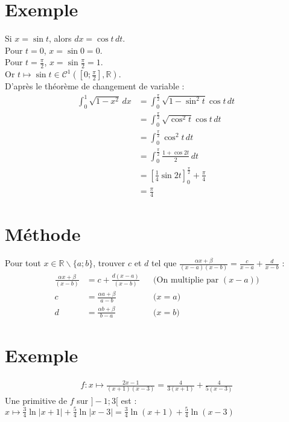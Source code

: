 \documentclass[../main.tex]{subfiles}
\begin{document}
\setcounter{section}{71}
\section{Exemple}
Si $x = \sin t$, alors $dx = \cos t \,dt$. \\
Pour $t = 0$, $x = \sin 0 = 0$. \\
Pour $t = \frac{\pi}{2}$, $x = \sin \frac{\pi}{2} = 1$. \\
Or $t \mapsto \sin t \in \mathcal{C}^1(\left[0 ; \frac{\pi}{2}\right], \mathbb{R})$. \\
D'après le théorème de changement de variable : 
\begin{align*}
    \int_{0}^{1} \sqrt{1 - x^2} \,dx &= \int_{0}^{\frac{\pi}{2}} \sqrt{1 - \sin^2 t} \cos t \,dt\ \\
    &= \int_{0}^{\frac{\pi}{2}} \sqrt{\cos^2 t} \cos t \,dt\ \\ 
    &= \int_{0}^{\frac{\pi}{2}} \cos^2 t \,dt\ \\
    &= \int_{0}^{\frac{\pi}{2}} \frac{1 + \cos 2t}{2} \,dt\ \\
    &= \left[\frac{1}{4} \sin 2t \right]_{0}^{\frac{\pi}{2}} + \frac{\pi}{4} \\
    &= \frac{\pi}{4} 
\end{align*}

\setcounter{section}{73}
\section{Méthode}
Pour tout $x \in \mathbb{R}\backslash \{ a ; b\}$, trouver $c$ et $d$ tel que $\frac{\alpha x + \beta}{(x - a)(x - b)} = \frac{c}{x-a} + \frac{d}{x - b}$ : 
\begin{align*}
    \frac{\alpha x + \beta}{(x - b)} &= c + \frac{d(x - a)}{(x - b)} && \text{(On multiplie par $(x - a)$)} \\
    c &= \frac{\alpha a + \beta}{a - b} && \text{($x = a$)} \\
    d &= \frac{\alpha b + \beta}{b - a} && \text{($x = b$)}
\end{align*}

\section{Exemple}
\begin{align*}
    f:x \mapsto \frac{2x - 1}{(x + 1)(x - 3)} = \frac{4}{3(x+1)} + \frac{4}{5(x - 3)}
\end{align*}
Une primitive de $f$ sur $]-1 ; 3[$ est : $x \mapsto \frac{3}{4} \ln |x + 1| + \frac{5}{4} \ln |x - 3| = \frac{3}{4} \ln (x + 1) + \frac{5}{4} \ln (x - 3)$
\end{document}
